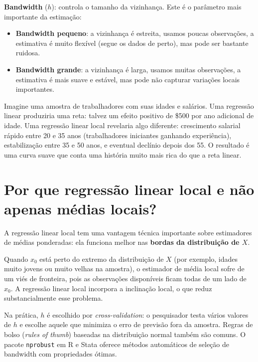 \textbf{Bandwidth} ($h$): controla o tamanho da vizinhança. Este é o parâmetro
mais importante da estimação:

\begin{itemize}
  \item \textbf{Bandwidth pequeno}: a vizinhança é estreita, usamos poucas observações,
  a estimativa é muito flexível (segue os dados de perto), mas pode ser bastante
  ruidosa.
  \item \textbf{Bandwidth grande}: a vizinhança é larga, usamos muitas observações,
  a estimativa é mais suave e estável, mas pode não capturar variações locais
  importantes.
\end{itemize}

\begin{exemplobox}
Imagine uma amostra de trabalhadores com suas idades e salários. Uma regressão linear
produziria uma reta: talvez um efeito positivo de \$500 por ano adicional de idade.
Uma regressão linear local revelaria algo diferente: crescimento salarial rápido entre
20 e 35 anos (trabalhadores iniciantes ganhando experiência), estabilização entre 35
e 50 anos, e eventual declínio depois dos 55. O resultado é uma curva suave que
conta uma história muito mais rica do que a reta linear.
\end{exemplobox}

\section*{Por que regressão linear local e não apenas médias locais?}

A regressão linear local tem uma vantagem técnica importante sobre estimadores de
médias ponderadas: ela funciona melhor nas \textbf{bordas da distribuição de $X$}.

Quando $x_0$ está perto do extremo da distribuição de $X$ (por exemplo, idades muito
jovens ou muito velhas na amostra), o estimador de média local sofre de um viés de
fronteira, pois as observações disponíveis ficam todas de um lado de $x_0$. A
regressão linear local incorpora a inclinação local, o que reduz substancialmente
esse problema.

\begin{notatecnica}
Na prática, $h$ é escolhido por \emph{cross-validation}: o pesquisador testa vários
valores de $h$ e escolhe aquele que minimiza o erro de previsão fora da amostra.
Regras de bolso (\emph{rules of thumb}) baseadas na distribuição normal também são
comuns. O pacote \texttt{nprobust} em R e Stata oferece métodos automáticos de
seleção de bandwidth com propriedades ótimas.
\end{notatecnica}

